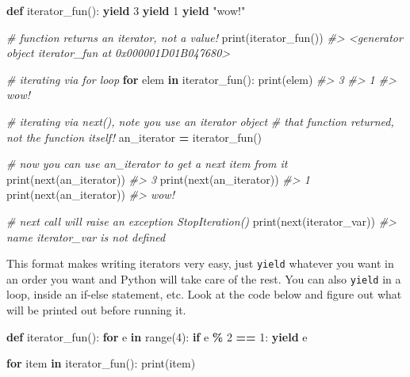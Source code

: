 \documentclass[
]{book}
\newenvironment{Shaded}{\begin{snugshade}}{\end{snugshade}}
\newcommand{\BuiltInTok}[1]{#1}
\newcommand{\CommentTok}[1]{\textcolor[rgb]{0.56,0.35,0.01}{\textit{#1}}}
\newcommand{\ControlFlowTok}[1]{\textcolor[rgb]{0.13,0.29,0.53}{\textbf{#1}}}
\newcommand{\DecValTok}[1]{\textcolor[rgb]{0.00,0.00,0.81}{#1}}
\newcommand{\KeywordTok}[1]{\textcolor[rgb]{0.13,0.29,0.53}{\textbf{#1}}}
\newcommand{\NormalTok}[1]{#1}
\newcommand{\OperatorTok}[1]{\textcolor[rgb]{0.81,0.36,0.00}{\textbf{#1}}}
\newcommand{\StringTok}[1]{\textcolor[rgb]{0.31,0.60,0.02}{#1}}
\begin{document}
\begin{Shaded}
\begin{Highlighting}[]
\KeywordTok{def}\NormalTok{ iterator\_fun():}
    \ControlFlowTok{yield} \DecValTok{3}
    \ControlFlowTok{yield} \DecValTok{1}
    \ControlFlowTok{yield} \StringTok{"wow!"}
  
\CommentTok{\# function returns an iterator, not a value!}
\BuiltInTok{print}\NormalTok{(iterator\_fun())}
\CommentTok{\#\textgreater{} \textless{}generator object iterator\_fun at 0x000001D01B047680\textgreater{}}

\CommentTok{\# iterating via for loop}
\ControlFlowTok{for}\NormalTok{ elem }\KeywordTok{in}\NormalTok{ iterator\_fun():}
    \BuiltInTok{print}\NormalTok{(elem)}
\CommentTok{\#\textgreater{} 3}
\CommentTok{\#\textgreater{} 1}
\CommentTok{\#\textgreater{} wow!}
    
\CommentTok{\# iterating via next(), note you use an iterator object }
\CommentTok{\# that function returned, not the function itself!}
\NormalTok{an\_iterator }\OperatorTok{=}\NormalTok{ iterator\_fun()  }

\CommentTok{\# now you can use an\_iterator to get a next item from it}
\BuiltInTok{print}\NormalTok{(}\BuiltInTok{next}\NormalTok{(an\_iterator))}
\CommentTok{\#\textgreater{} 3}
\BuiltInTok{print}\NormalTok{(}\BuiltInTok{next}\NormalTok{(an\_iterator))}
\CommentTok{\#\textgreater{} 1}
\BuiltInTok{print}\NormalTok{(}\BuiltInTok{next}\NormalTok{(an\_iterator))}
\CommentTok{\#\textgreater{} wow!}
\end{Highlighting}
\end{Shaded}

\begin{Shaded}
\begin{Highlighting}[]
\CommentTok{\# next call will raise an exception StopIteration()}
\BuiltInTok{print}\NormalTok{(}\BuiltInTok{next}\NormalTok{(iterator\_var))}
\CommentTok{\#\textgreater{} name \textquotesingle{}iterator\_var\textquotesingle{} is not defined}
\end{Highlighting}
\end{Shaded}

This format makes writing iterators very easy, just \texttt{yield} whatever you want in an order you want and Python will take care of the rest. You can also \texttt{yield} in a loop, inside an if-else statement, etc. Look at the code below and figure out what will be printed out before running it.

\begin{Shaded}
\begin{Highlighting}[]
\KeywordTok{def}\NormalTok{ iterator\_fun():}
  \ControlFlowTok{for}\NormalTok{ e }\KeywordTok{in} \BuiltInTok{range}\NormalTok{(}\DecValTok{4}\NormalTok{):}
    \ControlFlowTok{if}\NormalTok{ e }\OperatorTok{\%} \DecValTok{2} \OperatorTok{==} \DecValTok{1}\NormalTok{:}
      \ControlFlowTok{yield}\NormalTok{ e}

\ControlFlowTok{for}\NormalTok{ item }\KeywordTok{in}\NormalTok{ iterator\_fun():}
  \BuiltInTok{print}\NormalTok{(item)}
\end{Highlighting}
\end{Shaded}
\end{document}

